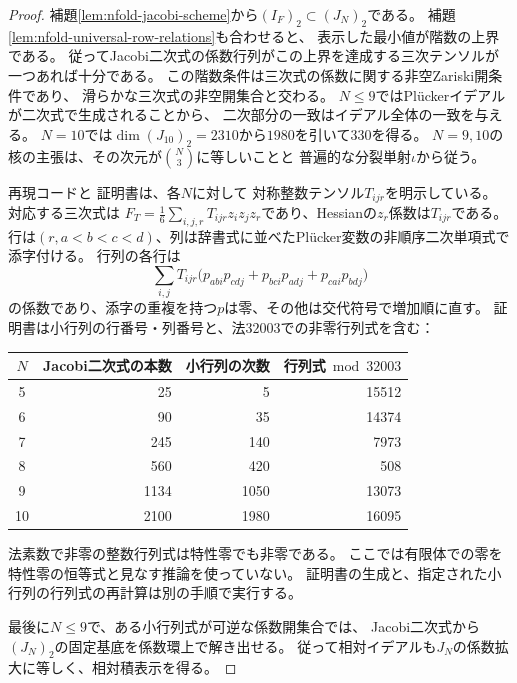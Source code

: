 \begin{proof}
補題\ref{lem:nfold-jacobi-scheme}から$(I_F)_2\subset(J_N)_2$である。
補題\ref{lem:nfold-universal-row-relations}も合わせると、
表示した最小値が階数の上界である。
従ってJacobi二次式の係数行列がこの上界を達成する三次テンソルが一つあれば十分である。
この階数条件は三次式の係数に関する非空Zariski開条件であり、
滑らかな三次式の非空開集合と交わる。
$N\le9$ではPl\"uckerイデアルが二次式で生成されることから、
二次部分の一致はイデアル全体の一致を与える。
$N=10$では$\dim(J_{10})_2=2310$から$1980$を引いて$330$を得る。
$N=9,10$の核の主張は、その次元が$\binom N3$に等しいことと
普遍的な分裂単射$\iota$から従う。

再現コードと
証明書は、各$N$に対して
対称整数テンソル$T_{ijr}$を明示している。
対応する三次式は
$F_T=\frac16\sum_{i,j,r}T_{ijr}z_i z_j z_r$であり、Hessianの$z_r$係数は$T_{ijr}$である。
行は$(r,a<b<c<d)$、列は辞書式に並べたPl\"ucker変数の非順序二次単項式で添字付ける。
行列の各行は
\begin{equation}\label{eq:nfold-certificate-matrix}
 \sum_{i,j}T_{ijr}
 \bigl(p_{abi}p_{cdj}+p_{bci}p_{adj}+p_{cai}p_{bdj}\bigr)
\end{equation}
の係数であり、添字の重複を持つ$p$は零、その他は交代符号で増加順に直す。
証明書は小行列の行番号・列番号と、法$32003$での非零行列式を含む：
\begin{center}
\begin{tabular}{c|r|r|r}
$N$ & Jacobi二次式の本数 & 小行列の次数 & 行列式$\bmod 32003$\\
\hline
5 & 25 & 5 & 15512\\
6 & 90 & 35 & 14374\\
7 & 245 & 140 & 7973\\
8 & 560 & 420 & 508\\
9 & 1134 & 1050 & 13073\\
10 & 2100 & 1980 & 16095
\end{tabular}
\end{center}
法素数で非零の整数行列式は特性零でも非零である。
ここでは有限体での零を特性零の恒等式と見なす推論を使っていない。
証明書の生成と、指定された小行列の行列式の再計算は別の手順で実行する。

最後に$N\le9$で、ある小行列式が可逆な係数開集合では、
Jacobi二次式から$(J_N)_2$の固定基底を係数環上で解き出せる。
従って相対イデアルも$J_N$の係数拡大に等しく、相対積表示を得る。
\end{proof}

